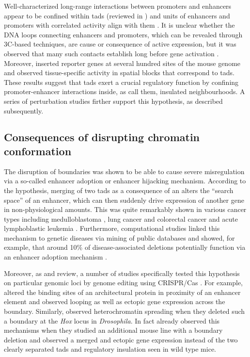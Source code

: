 Well-characterized long-range interactions between promoters and enhancers
appear to be confined within \acp{tad} (reviewed in \cite{Smallwood2013}) and
units of enhancers and promoters with correlated activity align with them
\citep{Shen2012}. It is unclear whether the DNA loops connecting enhancers
and promoters, which can be revealed through 3C-based techniques, are cause
or consequence of active expression, but it was
observed that many such contacts establish long before gene activation
\citep{Ghavi-Helm2014}. Moreover, \cite{Symmons2014} inserted reporter genes at
several hundred sites of the mouse genome and observed tissue-specific activity
in spatial blocks that correspond to \acp{tad}. These results suggest that
\acp{tad} exert a crucial regulatory function by confining promoter-enhancer
interactions inside, as \cite{Ji2016} call them, insulated neighbourhoods. A
series of perturbation studies firther support this hypothesis, as described
subsequently.





\subsection{Consequences of disrupting chromatin conformation}
\label{sec:disrupting_tads}

The disruption of \tad boundaries was shown to be able to cause severe
misregulation via a so-called enhancer adoption \citep{Lettice2011} or enhancer
hijacking \citep{Northcott2014} mechanism. According to the hypothesis, merging
of two \acp{tad} as a consequence of an \sv alters the ``search space'' of an
enhancer, which can then suddenly drive expression of another gene in
non-physiological amounts. This was quite remarkably shown in various cancer
types including medulloblastoma \citep{Northcott2014}, lung cancer and
colorectal cancer \citep{Weischenfeldt2016} and acute lymphoblastic leukemia
\citep{Hnisz2016}. Furthermore, computational studies linked this mechanism to
genetic diseases via mining of public databases and showed, for example, that
around 10\% of disease-associated deletions potentially function via an enhancer
adoption mechanism \citep{Ibn-Salem2014,Zepeda-Mendoza2017}.

Moreover, as \cite{Lupianez2016} and \cite{Krijger2016} review, a number of studies
specifically tested this hypothesis on particular genomic loci by genome
editing using CRISPR/Cas \citep{Doudna2014}. For example, \cite{Guo2015} altered
the binding sites of an architectural protein in proximity of an enhancer element
and observed looping as well as ectopic gene expression across the boundary.
Similarly, \cite{Narendra2015} observed heterochromatin spreading when they
deleted such a boundary at the \textit{Hox} locus in \textit{Drosophila}.
In fact already \cite{Nora2012} observed this mechanisms when they studied an
additional mouse line with a \tad boundary deletion and observed a merged \tad
and ectopic gene expression instead of the two clearly separated \acp{tad} and
regulatory insulation seen in wild type mice.

